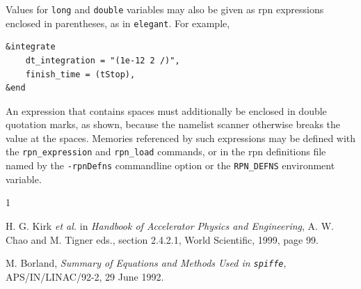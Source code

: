 \documentclass[11pt]{article}
\begin{document}
Values for \verb|long| and \verb|double| variables may also be given as rpn
expressions enclosed in parentheses, as in {\tt elegant}.  For example,
\begin{verbatim}
&integrate
    dt_integration = "(1e-12 2 /)",
    finish_time = (tStop),
&end
\end{verbatim}
An expression that contains spaces must additionally be enclosed in double
quotation marks, as shown, because the namelist scanner otherwise breaks the
value at the spaces.  Memories referenced by such expressions may be defined
with the \verb|rpn_expression| and \verb|rpn_load| commands, or in the rpn
definitions file named by the \verb|-rpnDefns| commandline option or the
\verb|RPN_DEFNS| environment variable.

























\newpage
\begin{thebibliography}{1}

 H. G. Kirk {\em et al.} in {\em Handbook of Accelerator
Physics and Engineering}, A. W. Chao and M. Tigner eds., section 2.4.2.1,
World Scientific, 1999, page 99.

 M. Borland, {\em Summary of Equations and Methods
        Used in {\tt spiffe}}, APS/IN/LINAC/92-2, 29 June 1992.

\end{thebibliography}
\end{document}
